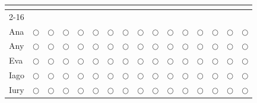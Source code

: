 \documentclass{article}
\begin{document}
\begin{center}
\begin{longtable}{ |p{6cm}|c|c|c|c|c|c|c|c|c|c|c|c|c|c|c|}
\hline
\hline

\multicolumn{16}{c}{\vspace*{0.5cm}\LARGE{\textbf{}}}\\
\cline{2-16}
\multicolumn{1}{c|}{}  &
&&&&&&&&&&&&&&\\ [6ex]
\hline
Ana 
&$\bigcirc$
&$\bigcirc$&$\bigcirc$&$\bigcirc$&$\bigcirc$&$\bigcirc$&$\bigcirc$&$\bigcirc$&$\bigcirc$&$\bigcirc$&$\bigcirc$&$\bigcirc$&$\bigcirc$&$\bigcirc$&$\bigcirc$\\
\hline
Any 
&$\bigcirc$
&$\bigcirc$&$\bigcirc$&$\bigcirc$&$\bigcirc$&$\bigcirc$&$\bigcirc$&$\bigcirc$&$\bigcirc$&$\bigcirc$&$\bigcirc$&$\bigcirc$&$\bigcirc$&$\bigcirc$&$\bigcirc$\\
\hline
Eva  
&$\bigcirc$&$\bigcirc$
&$\bigcirc$&$\bigcirc$&$\bigcirc$&$\bigcirc$&$\bigcirc$&$\bigcirc$&$\bigcirc$&$\bigcirc$&$\bigcirc$&$\bigcirc$&$\bigcirc$&$\bigcirc$&$\bigcirc$\\
\hline
 Iago 
&$\bigcirc$
&$\bigcirc$&$\bigcirc$&$\bigcirc$&$\bigcirc$&$\bigcirc$&$\bigcirc$&$\bigcirc$&$\bigcirc$&$\bigcirc$&$\bigcirc$&$\bigcirc$&$\bigcirc$&$\bigcirc$&$\bigcirc$\\
\hline
Iury 
&$\bigcirc$&$\bigcirc$
&$\bigcirc$&$\bigcirc$&$\bigcirc$&$\bigcirc$&$\bigcirc$&$\bigcirc$&$\bigcirc$&$\bigcirc$&$\bigcirc$&$\bigcirc$&$\bigcirc$&$\bigcirc$&$\bigcirc$\\

\end{longtable}
\end{center}
\end{document}
